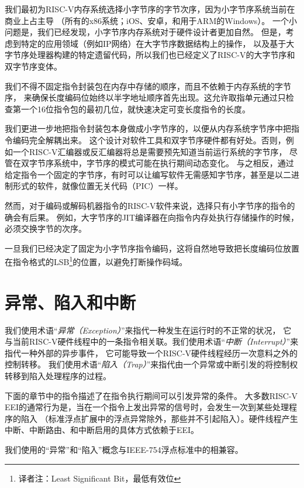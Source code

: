 \begin{commentary}

我们最初为RISC-V内存系统选择小字节序的字节次序，因为小字节序系统当前在商业上占主导
（所有的x86系统；iOS、安卓，和用于ARM的Windows）。
一个小问题是，我们已经发现，小字节序内存系统对于硬件设计者更加自然。
但是，考虑到特定的应用领域（例如IP网络）在大字节序数据结构上的操作，
以及基于大字节序处理器构建的特定遗留代码，所以我们也已经定义了RISC-V的大字节序和双字节序变体。

我们不得不固定指令封装包在内存中存储的顺序，而且不依赖于内存系统的字节序，
来确保长度编码位始终以半字地址顺序首先出现。这允许取指单元通过只检查第一个16位指令包的最初几位，就快速决定可变长度指令的长度。

我们更进一步地把指令封装包本身做成小字节序的，以便从内存系统字节序中把指令编码完全解耦出来。
这个设计对软件工具和双字节序硬件都有好处。否则，例如一个RISC-V汇编器或反汇编器将总是需要预先知道当前运行系统的字节序，
尽管在双字节序系统中，字节序的模式可能在执行期间动态变化。
与之相反，通过给定指令一个固定的字节序，有时可以让编写软件无需感知字节序，甚至是以二进制形式的软件，就像位置无关代码（PIC）一样。

然而，对于编码或解码机器指令的RISC-V软件来说，选择只有小字节序的指令的确会有后果。
例如，大字节序的JIT编译器在向指令内存处执行存储操作的时候，必须交换字节的次序。

一旦我们已经决定了固定为小字节序指令编码，这将自然地导致把长度编码位放置在指令格式的LSB\footnote{译者注：Least Significant Bit，最低有效位}的位置，以避免打断操作码域。
\end{commentary}

\section{异常、陷入和中断}
\label{sec:trap-defn}

我们使用术语“{\em 异常（Exception）}”来指代一种发生在运行时的不正常的状况，
它与当前RISC-V硬件线程中的一条指令相关联。我们使用术语“{\em 中断（Interrupt）}”来指代一种外部的异步事件，
它可能导致一个RISC-V硬件线程经历一次意料之外的控制转移。
我们使用术语“{\em 陷入（Trap）}”来指代由一个异常或中断引发的将控制权转移到陷入处理程序的过程。

下面的章节中的指令描述了在指令执行期间可以引发异常的条件。
大多数RISC-V EEI的通常行为是，当在一个指令上发出异常的信号时，会发生一次到某些处理程序的陷入
（标准浮点扩展中的浮点异常除外，那些并不引起陷入）。硬件线程产生中断、中断路由、和中断启用的具体方式依赖于EEI。


\begin{commentary}
  
  我们使用的“异常”和“陷入”概念与IEEE-754浮点标准中的相兼容。
\end{commentary}

